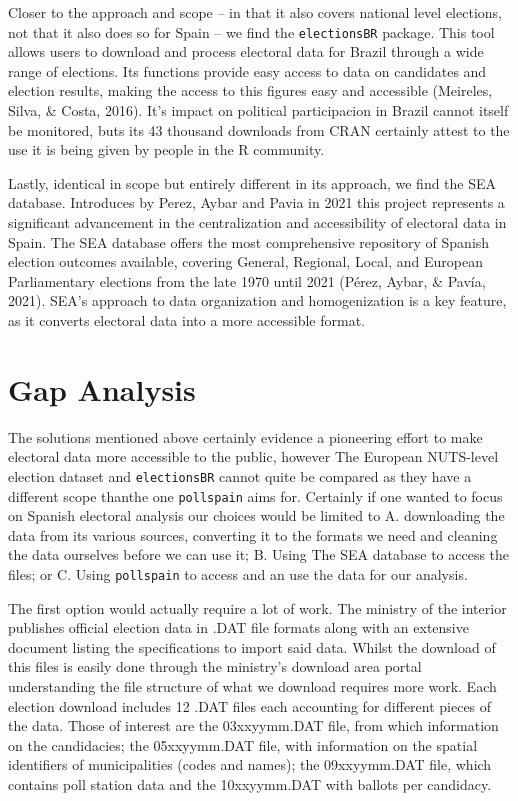 \documentclass[
  letterpaper,
  DIV=11,
  numbers=noendperiod]{scrreprt}
\begin{document}
Closer to the approach and scope -- in that it also covers national
level elections, not that it also does so for Spain -- we find the
\texttt{electionsBR} package. This tool allows users to download and
process electoral data for Brazil through a wide range of elections. Its
functions provide easy access to data on candidates and election
results, making the access to this figures easy and accessible
(Meireles, Silva, \& Costa, 2016). It's impact on political
participacion in Brazil cannot itself be monitored, buts its 43 thousand
downloads from CRAN certainly attest to the use it is being given by
people in the R community.

Lastly, identical in scope but entirely different in its approach, we
find the SEA database. Introduces by Perez, Aybar and Pavia in 2021 this
project represents a significant advancement in the centralization and
accessibility of electoral data in Spain. The SEA database offers the
most comprehensive repository of Spanish election outcomes available,
covering General, Regional, Local, and European Parliamentary elections
from the late 1970 until 2021 (Pérez, Aybar, \& Pavía, 2021). SEA's
approach to data organization and homogenization is a key feature, as it
converts electoral data into a more accessible format.

\hypertarget{gap-analysis}{%
\section{Gap Analysis}\label{gap-analysis}}

The solutions mentioned above certainly evidence a pioneering effort to
make electoral data more accessible to the public, however The European
NUTS-level election dataset and \texttt{electionsBR} cannot quite be
compared as they have a different scope thanthe one \texttt{pollspain}
aims for. Certainly if one wanted to focus on Spanish electoral analysis
our choices would be limited to A. downloading the data from its various
sources, converting it to the formats we need and cleaning the data
ourselves before we can use it; B. Using The SEA database to access the
files; or C. Using \texttt{pollspain} to access and an use the data for
our analysis.

The first option would actually require a lot of work. The ministry of
the interior publishes official election data in .DAT file formats along
with an extensive document listing the specifications to import said
data. Whilst the download of this files is easily done through the
ministry's download area portal understanding the file structure of what
we download requires more work. Each election download includes 12 .DAT
files each accounting for different pieces of the data. Those of
interest are the 03xxyymm.DAT file, from which information on the
candidacies; the 05xxyymm.DAT file, with information on the spatial
identifiers of municipalities (codes and names); the 09xxyymm.DAT file,
which contains poll station data and the 10xxyymm.DAT with ballots per
candidacy.
\end{document}
